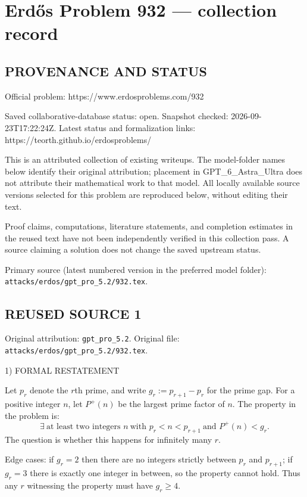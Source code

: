 \section*{Erd\H{o}s Problem 932 --- collection record}

\subsection*{PROVENANCE AND STATUS}
Official problem: https://www.erdosproblems.com/932

Saved collaborative-database status: open.
Snapshot checked: 2026-09-23T17:22:24Z.
Latest status and formalization links: https://teorth.github.io/erdosproblems/

This is an attributed collection of existing writeups. The model-folder names below identify their original attribution; placement in GPT\_6\_Astra\_Ultra does not attribute their mathematical work to that model. All locally available source versions selected for this problem are reproduced below, without editing their text.

Proof claims, computations, literature statements, and completion estimates in the reused text have not been independently verified in this collection pass. A source claiming a solution does not change the saved upstream status.

Primary source (latest numbered version in the preferred model folder): \texttt{attacks/erdos/gpt\_pro\_5.2/932.tex}.

\subsection*{REUSED SOURCE 1}
Original attribution: \texttt{gpt\_pro\_5.2}.
Original file: \texttt{attacks/erdos/gpt\_pro\_5.2/932.tex}.


1) FORMAL RESTATEMENT

Let $p_r$ denote the $r$th prime, and write $g_r:=p_{r+1}-p_r$ for the prime gap.
For a positive integer $n$, let $P^+(n)$ be the largest prime factor of $n$.
The property in the problem is:
\[
\exists\ \text{at least two integers }n\ \text{with }p_r<n<p_{r+1}\ \text{and }P^+(n)<g_r.
\]
The question is whether this happens for infinitely many $r$.

Edge cases: if $g_r=2$ then there are no integers strictly between $p_r$ and $p_{r+1}$; if $g_r=3$ there is exactly one integer in between, so the property cannot hold. Thus any $r$ witnessing the property must have $g_r\ge 4$.

